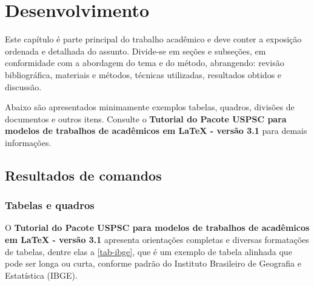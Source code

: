 

\chapter{Desenvolvimento}\label{cap_exemplos}
Este capítulo \'e parte principal do trabalho acad\^emico e deve conter a exposição ordenada e detalhada do assunto. Divide-se em seções e subseções, em conformidade com a abordagem do tema e do m\'etodo, abrangendo: revisão bibliogr\'afica, materiais e m\'etodos, t\'ecnicas utilizadas, resultados obtidos e discussão.

Abaixo são apresentados minimamente exemplos tabelas, quadros, divisões de documentos e outros itens. Consulte o \textbf{Tutorial do Pacote USPSC para modelos de trabalhos de acad\^emicos em LaTeX - vers\~ao 3.1} para demais informações. 

\section{Resultados de comandos}\label{sec-divisoes}

\subsection{Tabelas e quadros}

O \textbf{Tutorial do Pacote USPSC para modelos de trabalhos de acad\^emicos em LaTeX - vers\~ao 3.1} apresenta orientações completas e diversas formatações de tabelas, dentre elas a \autoref{tab-ibge}, que \'e um exemplo de tabela alinhada que pode ser longa ou curta, conforme padrão do Instituto Brasileiro de Geografia e Estatística (IBGE).

\begin{table}[htb]
\end{table}


